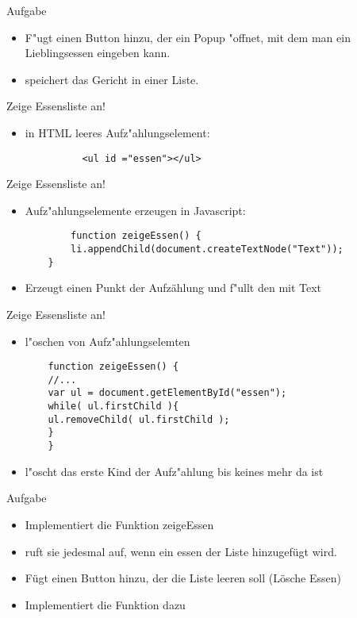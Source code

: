 \documentclass[18pt]{beamer}
\begin{document}
\begin{frame}[fragile]{Aufgabe}
\begin{itemize}
	\item F"ugt einen Button hinzu, der ein Popup "offnet, mit dem man ein Lieblingsessen eingeben kann.
	\item speichert das Gericht in einer Liste.
\end{itemize}
\end{frame}


\begin{frame}[fragile]{Zeige Essensliste an!}
\begin{itemize}
	\item in HTML leeres Aufz"ahlungselement:
	\begin{lstlisting}
		  <ul id ="essen"></ul>
	\end{lstlisting}
\end{itemize}
\end{frame}

\begin{frame}[fragile]{Zeige Essensliste an!}
\begin{itemize}
	\item Aufz"ahlungselemente erzeugen in Javascript: 
	\begin{lstlisting}
		function zeigeEssen() {
		li.appendChild(document.createTextNode("Text"));
	}
	\end{lstlisting}
	\item Erzeugt einen Punkt der Aufzählung und f"ullt den mit Text
\end{itemize}
\end{frame}


\begin{frame}[fragile]{Zeige Essensliste an!}
\begin{itemize}
	\item l"oschen von Aufz"ahlungselemten
	\begin{lstlisting}
	function zeigeEssen() {
	//...
	var ul = document.getElementById("essen");
	while( ul.firstChild ){
	ul.removeChild( ul.firstChild );
	}
	}
	\end{lstlisting}
	\item l"oscht das erste Kind der Aufz"ahlung bis keines mehr da ist
\end{itemize}

\end{frame}

\begin{frame}[fragile]{Aufgabe}
\begin{itemize}
	\item Implementiert die Funktion zeigeEssen
	\item ruft sie jedesmal auf, wenn ein essen der Liste hinzugefügt wird.
	\item Fügt einen Button hinzu, der die Liste leeren soll (Lösche Essen)
	\item Implementiert die Funktion dazu
\end{itemize}
\end{frame}
\end{document}
